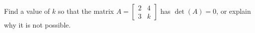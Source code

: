 Find a value of $k$ so that the matrix 
$A = 
\begin{bmatrix} 
2 & 4 \\ 
3 & k\end{bmatrix}$ 
has $\det(A) = 0$, or explain why it is not possible.
